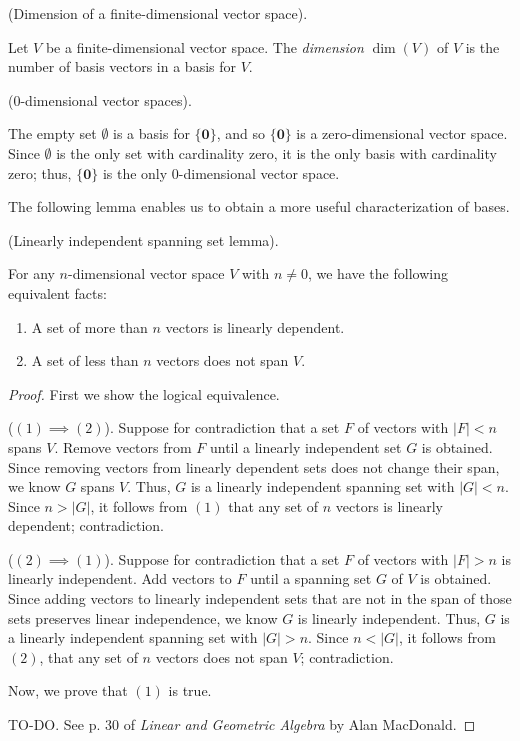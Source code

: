 \begin{defn}
    (Dimension of a finite-dimensional vector space).
    
    Let $V$ be a finite-dimensional vector space. The \textit{dimension} $\dim(V)$ of $V$ is the number of basis vectors in a basis for $V$.
\end{defn}

\begin{remark}
    ($0$-dimensional vector spaces). 
    
    The empty set $\emptyset$ is a basis for $\{\mathbf{0}\}$, and so $\{\mathbf{0}\}$ is a zero-dimensional vector space. Since $\emptyset$ is the only set with cardinality zero, it is the only basis with cardinality zero; thus, $\{\mathbf{0}\}$ is the only $0$-dimensional vector space.
\end{remark}

The following lemma enables us to obtain a more useful characterization of bases.

\begin{lemma}
\label{ch::lin_alg::lemma::dimension}
    (Linearly independent spanning set lemma). 
    
    For any $n$-dimensional vector space $V$ with $n \neq 0$, we have the following equivalent facts:
    
    \begin{enumerate}
        \item A set of more than $n$ vectors is linearly dependent.
        \item A set of less than $n$ vectors does not span $V$.
    \end{enumerate}
\end{lemma}

\begin{proof}
    First we show the logical equivalence.
    
    ($(1) \implies (2)$). Suppose for contradiction that a set $F$ of vectors with $|F| < n$ spans $V$. Remove vectors from $F$ until a linearly independent set $G$ is obtained. Since removing vectors from linearly dependent sets does not change their span, we know $G$ spans $V$. Thus, $G$ is a linearly independent spanning set with $|G| < n$. Since $n > |G|$, it follows from $(1)$ that any set of $n$ vectors is linearly dependent; contradiction.
    
    ($(2) \implies (1)$). Suppose for contradiction that a set $F$ of vectors with $|F| > n$ is linearly independent. Add vectors to $F$ until a spanning set $G$ of $V$ is obtained. Since adding vectors to linearly independent sets that are not in the span of those sets preserves linear independence, we know $G$ is linearly independent. Thus, $G$ is a linearly independent spanning set with $|G| > n$. Since $n < |G|$, it follows from $(2)$, that any set of $n$ vectors does not span $V$; contradiction.

    Now, we prove that $(1)$ is true.
    
    TO-DO. See p. 30 of \textit{Linear and Geometric Algebra} by Alan MacDonald.
\end{proof}

